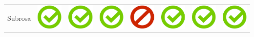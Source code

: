 \documentclass[10pt,foldmark,tumble]{leaflet}
\begin{document}
{{\begin{tabular}{ L{2cm} | C{2cm} | C{2cm} | C{2cm} | C{2cm} | C{2cm} | C{2cm} | C{2cm} | }
Subrosa & \includegraphics[scale=0.1]{pics/haken.png} & \includegraphics[scale=0.1]{pics/haken.png} & \includegraphics[scale=0.1]{pics/haken.png} & \includegraphics[scale=0.1]{pics/nohaken.png} & \includegraphics[scale=0.1]{pics/haken.png} & \includegraphics[scale=0.1]{pics/haken.png} & \includegraphics[scale=0.1]{pics/haken.png} \tabularnewline

\end{tabular}}}
\end{document}
